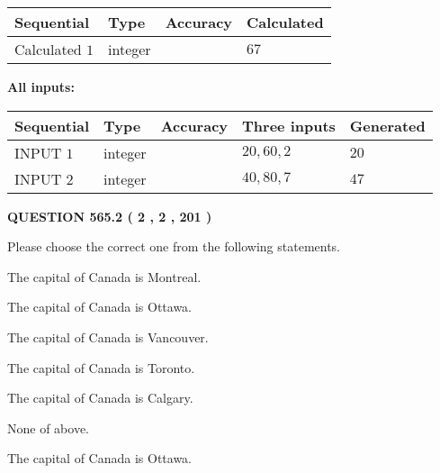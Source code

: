\documentclass[12pt]{article}
\begin{document}
   
  
  
\noindent\begin{tabular}{|l|l|l|l|}
\hline
 Sequential & Type & Accuracy & Calculated \\ 
\hline
 
 
  Calculated $  1 $ & integer &  & 
  $ 67 $ 
 \\  \hline  
 \end{tabular}
   
   
   
   
\noindent\vspace{0.1in}\hspace{-0.08in} {\textbf{\Large{All inputs: }}}
   
   
  
  
\noindent\begin{tabular}{|l|l|l|l|l|}
\hline
 Sequential & Type & Accuracy & Three inputs & Generated \\ 
\hline
 
 
  INPUT $  1 $ & integer &  & $
 20
 , 
 60
 , 
 2
 $ & $ 20 $ 
 \\  \hline  
 
 
  INPUT $  2 $ & integer &  & $
 40
 , 
 80
 , 
 7
 $ & $ 47 $ 
 \\  \hline  
 \end{tabular}
   
   
  
\vspace{0.2in}
  
{\textbf{\Large{QUESTION
565.2 
 ( 2 , 2 , 201 )
}}}
  
  
Please choose the correct one from the following statements.
 
 
The capital of Canada is Montreal.
 
 
The capital of Canada is Ottawa.
 
 
The capital of Canada is Vancouver.
 
 
The capital of Canada is Toronto.
 
 
The capital of Canada is Calgary.
 
 
 None of above.
 
 
\noindent{}
 
 
The capital of Canada is Ottawa.
 
\end{document}

